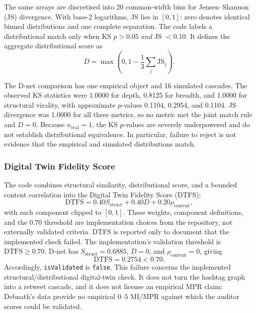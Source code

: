 The same arrays are discretised into 20 common-width bins for Jensen--Shannon (JS)
divergence.  With base-2 logarithms, JS lies in \([0,1]\): zero denotes identical
binned distributions and one complete separation.  The code labels a distributional
match only when KS \(p>0.05\) \emph{and} JS \(<0.10\).  It defines the aggregate
distributional score as
\begin{equation}
  D= \max\left(0,1-\frac{1}{3}
       \sum_j \mathrm{JS}_j\right).
  \label{eq:distribution-score}
\end{equation}

The D-net comparison has one empirical object and 16 simulated cascades.  The observed
KS statistics were 1.0000 for depth, 0.8125 for breadth, and 1.0000 for structural
virality, with approximate \(p\)-values 0.1104, 0.2954, and 0.1104.  JS divergence was
1.0000 for all three metrics, so no metric met the joint match rule and \(D=0\).
Because \(n_{\mathrm{real}}=1\), the KS \(p\)-values are severely underpowered and do
not establish distributional equivalence.  In particular, failure to reject is not
evidence that the empirical and simulated distributions match.

\subsubsection{Digital Twin Fidelity Score}

The code combines structural similarity, distributional score, and a bounded content
correlation into the Digital Twin Fidelity Score (DTFS):
\begin{equation}
  \mathrm{DTFS}
  =0.40S_{\mathrm{struct}}+0.40D+0.20\rho_{\mathrm{content}},
  \label{eq:dtfs}
\end{equation}
with each component clipped to \([0,1]\). These weights, component definitions,
and the \(0.70\) threshold are implementation choices from the repository, not
externally validated criteria. DTFS is reported only to document that the
implemented check failed. The implementation's validation threshold
is \(\mathrm{DTFS}\geq0.70\).  D-net has
\(S_{\mathrm{struct}}=0.6885\), \(D=0\), and
\(\rho_{\mathrm{content}}=0\), giving
\[
  \mathrm{DTFS}=0.2754<0.70.
\]
Accordingly, \texttt{isValidated} is \texttt{false}.  This failure concerns the
implemented structural/distributional digital-twin check.  It does not turn the
hashtag graph into a retweet cascade, and it does not license an empirical MPR claim:
Debnath's data provide no empirical \(0\)--\(5\) MI/MPR against which the auditor
scores could be validated.

